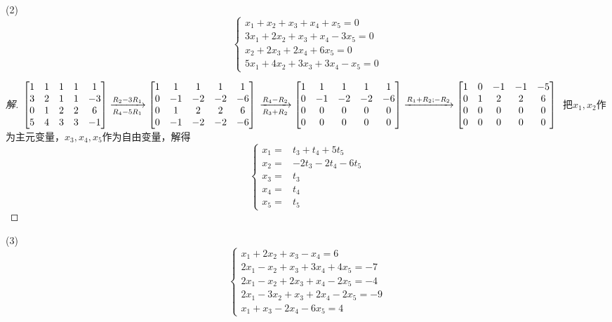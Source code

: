 \documentclass[10pt,a4paper]{report}
\begin{document}
\noindent (2)
$$
\left\{
\begin{aligned}
x_{1}+x_{2}+x_{3}+x_{4}+x_{5} = 0 \\
3x_{1}+2x_{2}+x_{3}+x_{4}-3x_{5}=0 \\
x_{2}+2x_{3}+2x_{4}+6x_{5}=0 \\
5x_{1}+4x_{2}+3x_{3}+3x_{4}-x_{5}=0
\end{aligned}
\right.
$$
\begin{proof}[解]
	$
	\left[
	\begin{matrix}
	1 & 1 & 1 & 1 & 1\\
	3 & 2 & 1 & 1 & -3\\
	0 & 1 & 2 & 2 & 6 \\
	5 & 4 & 3 & 3 & -1
	\end{matrix}
	\right] \xrightarrow[R_{4}-5R_{1}]{R_{2}-3R_{1}}
	\left[
	\begin{matrix}
	1 & 1 & 1 & 1 & 1\\
	0 & -1 & -2 & -2 & -6\\
	0 & 1 & 2 & 2 & 6 \\
	0 & -1 & -2 & -2 & -6
	\end{matrix}
	\right]\\ \xrightarrow[R_{3}+R_{2}]{R_{4}-R_{2}}
	\left[
	\begin{matrix}
	1 & 1 & 1 & 1 & 1\\
	0 & -1 & -2 & -2 & -6\\
	0 & 0 & 0 & 0 & 0 \\
	0 & 0 & 0 & 0 & 0
	\end{matrix}
	\right] \xrightarrow{R_{1}+R_{2};-R_{2}}
	\left[
	\begin{matrix}
	1 & 0 & -1 & -1 & -5\\
	0 & 1 & 2 & 2 & 6\\
	0 & 0 & 0 & 0 & 0 \\
	0 & 0 & 0 & 0 & 0
	\end{matrix}
	\right]\\
	$
	把$x_{1},x_{2}$作为主元变量，$x_{3},x_{4},x_{5}$作为自由变量，解得
	$$
	\left\{
	\begin{aligned}
	x_{1} = & t_{3}+t_{4}+5t_{5} \\
	x_{2} = & -2t_{3}-2t_{4}-6t_{5} \\
	x_{3} = & t_{3} \\
	x_{4} = & t_{4} \\
	x_{5} = & t_{5}
	\end{aligned}
	\right.
	$$
\end{proof}
\noindent (3)
$$
\left\{
\begin{aligned}
x_{1}+2x_{2}+x_{3}-x_{4}=6\\
2x_{1}-x_{2}+x_{3}+3x_{4}+4x_{5}=-7 \\
2x_{1}-x_{2}+2x_{3}+x_{4}-2x_{5}=-4 \\
2x_{1}-3x_{2}+x_{3}+2x_{4}-2x_{5}=-9 \\
x_{1}+x_{3}-2x_{4}-6x_{5} = 4
\end{aligned}
\right.
$$
\end{document}
